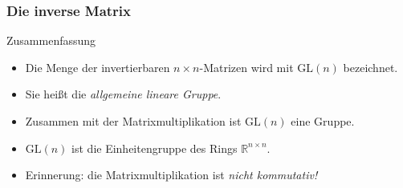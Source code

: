 \documentclass{beamer}
\renewcommand{\emph}[1]{{\textcolor{solarizedRed}{\itshape #1}}}
\newcommand\RR{\mathbb R}
\newcommand{\GL}{\mathrm{GL}}
\newcommand{\mytitle}{Die inverse Matrix}
\begin{document}
\begin{frame}\frametitle{\mytitle}
	\begin{block}{Zusammenfassung}
		\begin{itemize}
			\item Die Menge der invertierbaren $n\times n$-Matrizen wird mit $\GL(n)$ bezeichnet.
			\item Sie hei\ss t die \emph{allgemeine lineare Gruppe}.
			\item Zusammen mit der Matrixmultiplikation ist $\GL(n)$ eine Gruppe.
			\item $\GL(n)$ ist die Einheitengruppe des Rings $\RR^{n\times n}$.
			\item \alert{Erinnerung:} die Matrixmultiplikation ist \emph{nicht kommutativ!}
		\end{itemize}	
	\end{block}
\end{frame}
\end{document}
